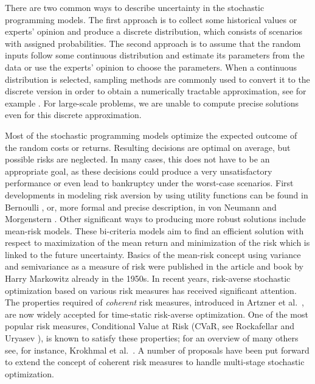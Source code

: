 \documentclass{article}              %
\begin{document}
There are two common ways to describe uncertainty in the stochastic programming models. The first approach is to collect some historical values or experts' opinion and produce a discrete distribution, which consists of scenarios with assigned probabilities. The second approach is to assume that the random inputs follow some continuous distribution and estimate its parameters from the data or use the experts' opinion to choose the parameters. When a continuous distribution is selected, sampling methods are commonly used to convert it to the discrete version in order to obtain a numerically tractable approximation, see for example \cite{pflug2014multistage}. For large-scale problems, we are unable to compute precise solutions even for this discrete approximation. 

Most of the stochastic programming models optimize the expected outcome of the random costs or returns. Resulting decisions are optimal on average, but possible risks are neglected. In many cases, this does not have to be an appropriate goal, as these decisions could produce a very unsatisfactory performance or even lead to bankruptcy under the worst-case scenarios. First developments in modeling risk aversion by using utility functions can be found in Bernoulli \cite{bernoulli}, or, more formal and precise description, in von Neumann and Morgenstern \cite{neumann}. Other significant ways to producing more robust solutions include mean-risk models. These bi-criteria models aim to find an efficient solution with respect to maximization of the mean return and minimization of the risk which is linked to the future uncertainty. Basics of the mean-risk concept using  variance and semivariance as a measure of risk were published in the article \cite{markowitz_artic} and  book \cite{markowitz_book}  by Harry Markowitz already in the 1950s. In recent years, risk-averse stochastic optimization based on various risk measures has received significant attention. The properties required of {\em coherent} risk measures, introduced in Artzner et al.\ \cite{artzner_99}, are now widely accepted for time-static risk-averse optimization. One of the most popular risk measures, Conditional Value at Risk (CVaR, see Rockafellar and Uryasev \cite{rockafellar2002conditional}), is known to satisfy these properties; for an overview of many others see, for instance, Krokhmal et al.\ \cite{K-U-Z}. A number of proposals have been put forward to extend the concept of coherent risk measures to handle multi-stage stochastic optimization.
\end{document}
